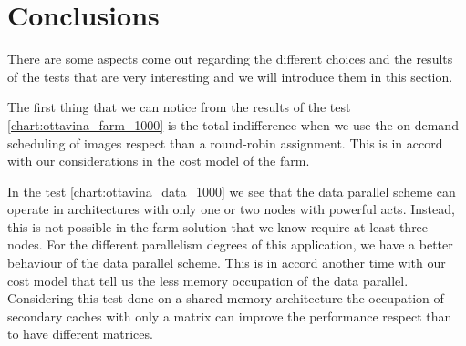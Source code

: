 \section{Conclusions}

There are some aspects come out regarding the different choices and the results of the tests that are very interesting and we will introduce them in this section.

The first thing that we can notice from the results of the test \ref{chart:ottavina_farm_1000} is the total indifference when we use the on-demand scheduling of images respect than a round-robin assignment. This is in accord with our considerations in the cost model of the farm.

In the test \ref{chart:ottavina_data_1000} we see that the data parallel scheme can operate in architectures with only one or two nodes with powerful acts. Instead, this is not possible in the farm solution that we know require at least three nodes. For the different parallelism degrees of this application, we have a better behaviour of the data parallel scheme. This is in accord another time with our cost model that tell us the less memory occupation of the data parallel. Considering this test done on a shared memory architecture the occupation of secondary caches with only a matrix can improve the performance respect than to have different matrices.